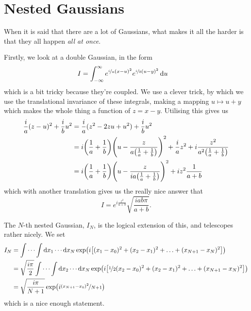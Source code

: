 \documentclass[]{scrreprt}
\begin{document}
\section{Nested Gaussians}\label{sec:nested-gaussians}
When it is said that there are a lot of Gaussians, what makes it all the harder is that they all happen \emph{all at once}.

Firstly, we look at a double Gaussian, in the form
\begin{align*}
  I &= \int_{-\infty}^\infty e^{\nicefrac{i}{a} {(x-u)^2}}e^{ \nicefrac{i}{b}(u-y)^2}\dd{u}
\end{align*}
which is a bit tricky because they're coupled.
We use a clever trick, by which we use the translational invariance of these integrals, making a mapping \( u \mapsto u + y \) which makes the whole thing a function of \( z = x - y \).
Utilising this gives us
\begin{align*}
  \frac{i}{a}(z-u)^2 + \frac{i}{b}u^2 &= \frac{i}{a}(z^2 - 2zu + u^2) + \frac{i}{b}u^2\\
  &= i\qty(\frac{1}{a} + \frac{1}{b})\qty(u - \frac{z}{a \qty(\frac{1}{a} + \frac{1}{b})})^2 + \frac{i}{a}z^2 + i \frac{z^2}{a^2 \qty(\frac{1}{a}  + \frac{1}{b})}\\
  &= i\qty(\frac{1}{a} + \frac{1}{b})\qty(u - \frac{z}{ia \qty(\frac{1}{a} + \frac{1}{b})})^2 + iz^2\frac{1}{a + b}
\end{align*}
which with another translation gives us the really nice answer that \[ I = e^{i\frac{z^2}{a + b}} \sqrt{\frac{iab\pi}{a+b}}.\]

The $N$-th nested Gaussian, \( I_N \), is the logical extension of this, and telescopes rather nicely.
We set
\begin{align*}
  I_N &= \idotsint \dd{x_1} \cdots \dd{x_N} \exp(i \qty[ (x_1 - x_0 )^2 + (x_2 - x_1)^2 + \ldots + (x_{N+1} - x_{N})^2])\\
      &= \sqrt{\frac{i\pi}{2}}\idotsint \dd{x_2} \cdots \dd{x_N} \exp(i \qty[ \nicefrac{1}{2}(x_2 - x_0 )^2 + (x_2 - x_1)^2 + \ldots + (x_{N+1} - x_{N})^2])\\
      &= \sqrt{\frac{i\pi}{N+1}}\exp(i \nicefrac{(x_{N+1} - x_0)^2}{N+1})
\end{align*}
which is a nice enough statement.
\end{document}
